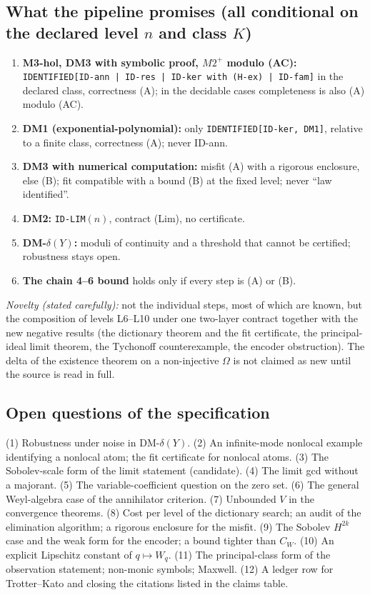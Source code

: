 \subsection*{What the pipeline promises (all conditional on the declared level $n$ and class $K$)}
\begin{enumerate}
\item \textbf{M3-hol, DM3 with symbolic proof, $M2^+$ modulo (AC):} \texttt{IDENTIFIED[ID-ann | ID-res | ID-ker with (H-ex) | ID-fam]} in the declared class, correctness (A); in the decidable cases completeness is also (A) modulo (AC).
\item \textbf{DM1 (exponential-polynomial):} only \texttt{IDENTIFIED[ID-ker, DM1]}, relative to a finite class, correctness (A); never ID-ann.
\item \textbf{DM3 with numerical computation:} misfit (A) with a rigorous enclosure, else (B); fit compatible with a bound (B) at the fixed level; never ``law identified''.
\item \textbf{DM2:} \texttt{ID-LIM}$(n)$, contract (Lim), no certificate.
\item \textbf{DM-$\delta(Y)$:} moduli of continuity and a threshold that cannot be certified; robustness stays open.
\item \textbf{The chain 4--6 bound} holds only if every step is (A) or (B).
\end{enumerate}
\emph{Novelty (stated carefully):} not the individual steps, most of which are known, but the composition of levels L6--L10 under one two-layer contract together with the new negative results (the dictionary theorem and the fit certificate, the principal-ideal limit theorem, the Tychonoff counterexample, the encoder obstruction). The delta of the existence theorem on a non-injective $\Omega$ is not claimed as new until the source is read in full.

\subsection*{Open questions of the specification}
(1) Robustness under noise in DM-$\delta(Y)$. (2) An infinite-mode nonlocal example identifying a nonlocal atom; the fit certificate for nonlocal atoms. (3) The Sobolev-scale form of the limit statement (candidate). (4) The limit gcd without a majorant. (5) The variable-coefficient question on the zero set. (6) The general Weyl-algebra case of the annihilator criterion. (7) Unbounded $V$ in the convergence theorems. (8) Cost per level of the dictionary search; an audit of the elimination algorithm; a rigorous enclosure for the misfit. (9) The Sobolev $H^{2k}$ case and the weak form for the encoder; a bound tighter than $C_W$. (10) An explicit Lipschitz constant of $q\mapsto W_q$. (11) The principal-class form of the observation statement; non-monic symbols; Maxwell. (12) A ledger row for Trotter--Kato and closing the citations listed in the claims table.
